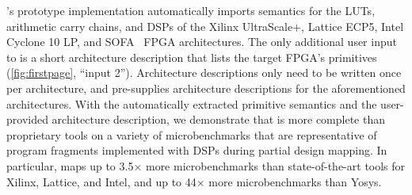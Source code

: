 \lr's prototype implementation automatically
  imports semantics for the LUTs, arithmetic carry chains,
  and DSPs of the Xilinx UltraScale+, Lattice ECP5,
  Intel Cyclone 10 LP,
  and SOFA~\cite{sofa} FPGA architectures. 
The only additional user input to \lr is a short 
  architecture description
  that lists the target FPGA's
  primitives (\cref{fig:firstpage}, ``input 2'').
Architecture descriptions
  only need to be written once per architecture,
  and \lr pre-supplies architecture descriptions
  for the aforementioned architectures.
With the automatically
  extracted primitive semantics
  and the user-provided architecture description,
  we demonstrate that \lr
  is more complete than proprietary tools on a variety
  of microbenchmarks
that are representative of program fragments
  implemented with DSPs during partial design mapping.
In particular,
  \lr maps up to 3.5$\times$ 
  more microbenchmarks than 
  state-of-the-art
  tools for Xilinx, Lattice, and Intel,
  and up to 44$\times$ 
  more microbenchmarks 
  than Yosys.


